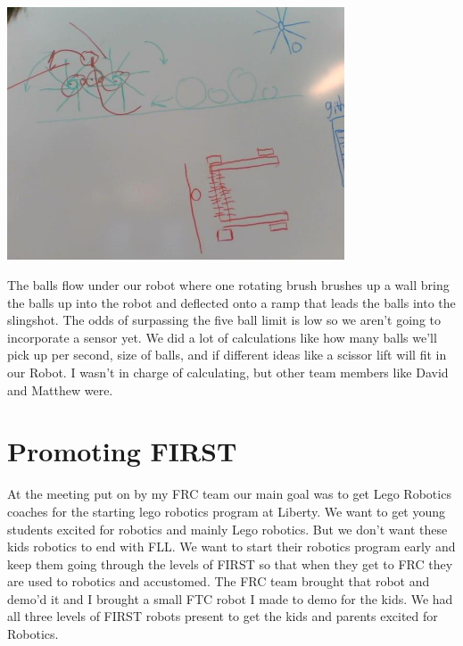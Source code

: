 \begin{center}
 \includegraphics[width=10cm]{./Entries/Images/RotatingBrushes.jpg}
 \end{center}

The balls flow under our robot where one rotating brush brushes up a wall bring the
balls up into the robot and deflected onto a ramp that leads the balls into the
slingshot. The odds of surpassing the five ball limit is low so we aren’t going to incorporate a sensor yet. 
We did a lot of calculations like how many balls we’ll pick up per second, size of balls, and if different ideas like a scissor lift will fit in our Robot. I wasn’t in charge of calculating, but other team members like David and Matthew were.

\section*{Promoting FIRST}
At the meeting put on by my FRC team our main goal was to get Lego Robotics coaches for the starting lego robotics program at Liberty. We want to get young students excited for robotics and mainly Lego robotics. But we don’t want these kids robotics to end with FLL. We want to start their robotics program early and keep them going through the levels of FIRST so that when they get to FRC they are used to robotics and accustomed. The FRC team brought that robot and demo’d it and I brought a small FTC robot I made to demo for the kids. We had all three levels of FIRST robots present to get the kids and parents excited for Robotics.

